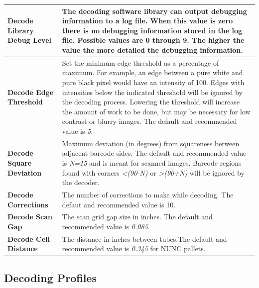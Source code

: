 \begin{center}
\begin{tabular}{|l|p{4in}|}
  \hline
  \textbf{Decode Library Debug Level} & The decoding software library can
  output debugging information to a log file. When this value is zero there is
  no debugging information stored in the log file. Possible values are 0
  through 9. The higher the value the more detailed the debugging information.\\
  \hline

  \textbf{Decode Edge Threshold} & Set the minimum edge threshold as a
  percentage of maximum. For example, an edge between a pure white and pure
  black pixel would have an intensity of 100.  Edges with intensities below the
  indicated threshold will be ignored by the decoding process. Lowering the
  threshold will increase the amount of work to be done, but may be necessary
  for low contrast or blurry images. The default and recommended value is
  \emph{5}.\\

  \hline

  \textbf{Decode Square Deviation} & Maximum deviation (in degrees) from
  squareness between adjacent barcode sides. The default and recommended value
  is \emph{N=15} and is meant for scanned images. Barcode regions found with
  corners \emph{<(90-N)} or \emph{>(90+N)} will be ignored by the decoder.\\

  \hline
  \textbf{Decode Corrections} &  The number of corrections to make while
  decoding. The defaut and recommended value is 10.\\
  \hline
  \textbf{Decode Scan Gap} & The scan grid gap size in inches. The
  default and recommended value is \emph{0.085}.\\
  \hline
  \textbf{Decode Cell Distance} & The distance in inches between tubes.The
  default and recommended value is \emph{0.345} for NUNC pallets.\\
  \hline
\end{tabular}
\end{center}

\subsection{Decoding Profiles}
